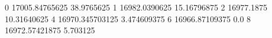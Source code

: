 0 17005.84765625 38.9765625
1 16982.0390625 15.16796875
2 16977.1875 10.31640625
4 16970.345703125 3.474609375
6 16966.87109375 0.0
8 16972.57421875 5.703125
